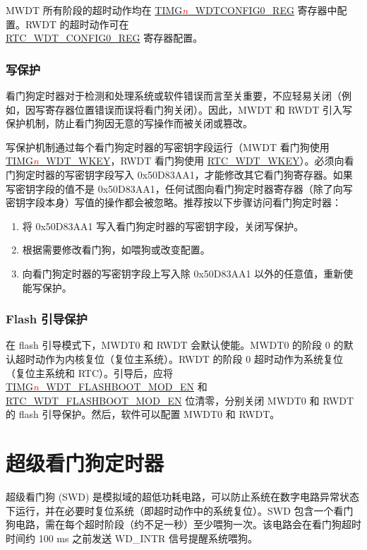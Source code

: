 \documentclass[main\_\_CN.tex]{subfiles}
\begin{document}
MWDT 所有阶段的超时动作均在 \hyperref[regdesc:TIMGWDTCONFIG0REG]{TIMG\textcolor{red}{\it{n}}\_WDTCONFIG0\_REG} 寄存器中配置。RWDT 的超时动作可在\\ \hyperref[regdesc:RTCWDTCONFIG0REG]{RTC\_WDT\_CONFIG0\_REG} 寄存器配置。

\subsubsection{写保护}
看门狗定时器对于检测和处理系统或软件错误而言至关重要，不应轻易关闭（例如，因写寄存器位置错误而误将看门狗关闭）。因此，MWDT 和 RWDT 引入写保护机制，防止看门狗因无意的写操作而被关闭或篡改。

写保护机制通过每个看门狗定时器的写密钥字段运行（MWDT 看门狗使用 \hyperref[fielddesc:TIMGWDTWKEY]{TIMG\textcolor{red}{\it{n}}\_WDT\_WKEY}，RWDT 看门狗使用 \hyperref[fielddesc:RTCWDTWKEY]{RTC\_WDT\_WKEY}）。必须向看门狗定时器的写密钥字段写入 0x50D83AA1，才能修改其它看门狗寄存器。如果写密钥字段的值不是 0x50D83AA1，任何试图向看门狗定时器寄存器（除了向写密钥字段本身）写值的操作都会被忽略。推荐按以下步骤访问看门狗定时器：

\begin{enumerate}
\item 将 0x50D83AA1 写入看门狗定时器的写密钥字段，关闭写保护。
\item 根据需要修改看门狗，如喂狗或改变配置。
\item 向看门狗定时器的写密钥字段上写入除 0x50D83AA1 以外的任意值，重新使能写保护。
\end{enumerate}

\subsubsection{Flash 引导保护}
在 flash 引导模式下，MWDT0 和 RWDT 会默认使能。MWDT0 的阶段 0 的默认超时动作为内核复位（复位主系统）。RWDT 的阶段 0 超时动作为系统复位（复位主系统和 RTC）。引导后，应将 \hyperref[fielddesc:TIMGWDTFLASHBOOTMODEN]{TIMG\textcolor{red}{\it{n}}\_WDT\_FLASHBOOT\_MOD\_EN} 和 \hyperref[fielddesc:RTCWDTFLASHBOOTMODEN]{RTC\_WDT\_FLASHBOOT\_MOD\_EN} 位清零，分别关闭 MWDT0 和 RWDT的 flash 引导保护。然后，软件可以配置 MWDT0 和 RWDT。


\section{超级看门狗定时器}\label{sec:wdt-swdt}

超级看门狗 (SWD) 是模拟域的超低功耗电路，可以防止系统在数字电路异常状态下运行，并在必要时复位系统（即超时动作中的系统复位）。SWD 包含一个看门狗电路，需在每个超时阶段（约不足一秒）至少喂狗一次。该电路会在看门狗超时时间约 100 ms 之前发送 WD\_INTR 信号提醒系统喂狗。
\end{document}
